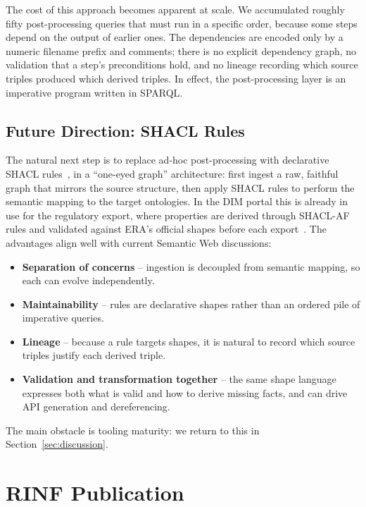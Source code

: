 \documentclass[twocolumn]{ceurart}
\begin{document}
The cost of this approach becomes apparent at scale. We accumulated roughly
fifty post-processing queries that must run in a specific order, because some
steps depend on the output of earlier ones. The dependencies are encoded only by
a numeric filename prefix and comments; there is no explicit dependency graph, no
validation that a step's preconditions hold, and no lineage recording which
source triples produced which derived triples. In effect, the post-processing
layer is an imperative program written in SPARQL.

\subsection{Future Direction: SHACL Rules}

The natural next step is to replace ad-hoc post-processing with declarative SHACL
rules~\cite{shacl,shaclaf}, in a ``one-eyed graph'' architecture: first ingest a
raw, faithful graph that mirrors the source structure, then apply SHACL rules to
perform the semantic mapping to the target ontologies. In the DIM portal this is
already in use for the regulatory export, where properties are derived through
SHACL-AF rules and validated against ERA's official shapes before each
export~\cite{dim}. The advantages align well with current Semantic Web
discussions:

\begin{itemize}
  \item \textbf{Separation of concerns} -- ingestion is decoupled from semantic
        mapping, so each can evolve independently.
  \item \textbf{Maintainability} -- rules are declarative shapes rather than an
        ordered pile of imperative queries.
  \item \textbf{Lineage} -- because a rule targets shapes, it is natural to
        record which source triples justify each derived triple.
  \item \textbf{Validation and transformation together} -- the same shape
        language expresses both what is valid and how to derive missing facts,
        and can drive API generation and dereferencing.
\end{itemize}

The main obstacle is tooling maturity: we return to this in
Section~\ref{sec:discussion}.

\section{RINF Publication}
\label{sec:rinf}
\end{document}

